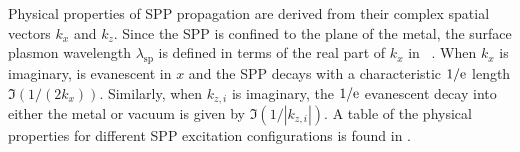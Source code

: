 Physical properties of SPP propagation are derived from their complex
spatial vectors $k_x$ and $k_z$.  Since the SPP is confined to the plane of
the metal, the surface plasmon wavelength $\lambda_\text{sp}$ is defined in
terms of the real part of $k_x$ in
~\cite{raether1997surface}.  When $k_x$ is imaginary,
 is evanescent in $x$ and the SPP decays with a
characteristic $1/{\mathrm{e}}$ length $\Im(1/(2k_x))$.  Similarly, when $k_{z,i}$
is imaginary, the $1/{\mathrm{e}}$ evanescent decay into either the metal or vacuum
is given by $\Im(1/|k_{z,i}|)$.  A table of the physical properties for
different SPP excitation configurations is found in
.
